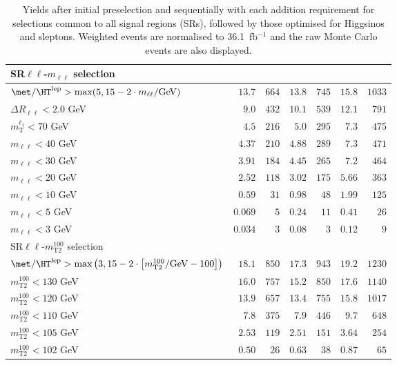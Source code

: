 \begin{table}
\begin{center}
\begin{tabular*}{\textwidth}{@{\extracolsep{\fill}}lrrrrrr}
\midrule
SR$\ell\ell$-$m_{\ell\ell}$ selection &  &  & \\ 
\midrule
$\met / \HT^\text{lep} > \text{max}(5, 15-2\cdot m_{\ell\ell}/\text{GeV})$ & $13.7$ & $664$    & $13.8$ & $745$    & $15.8$ & $1033$   \\ 
    $\Delta R_{\ell\ell} < 2.0$ GeV & $9.0$ & $432$    & $10.1$ & $539$    & $12.1$ & $791$   \\ 
    $m_\text{T}^{\ell_1} < 70$ GeV & $4.5$ & $216$    & $5.0$ & $295$    & $7.3$ & $475$   \\ 
    $m_{\ell\ell} < 40$ GeV & $4.37$ & $210$    & $4.88$ & $289$    & $7.3$ & $471$   \\ 
    $m_{\ell\ell} < 30$ GeV & $3.91$ & $184$    & $4.45$ & $265$    & $7.2$ & $464$   \\ 
    $m_{\ell\ell} < 20$ GeV & $2.52$ & $118$    & $3.02$ & $175$    & $5.66$ & $363$   \\ 
    $m_{\ell\ell} < 10$ GeV & $0.59$ & $31$    & $0.98$ & $48$    & $1.99$ & $125$   \\ 
    $m_{\ell\ell} < 5$ GeV & $0.069$ & $5$    & $0.24$ & $11$    & $0.41$ & $26$   \\ 
    $m_{\ell\ell} < 3$ GeV & $0.034$ & $3$    & $0.08$ & $3$    & $0.12$ & $9$   \\ 
    \midrule
SR$\ell\ell$-$m_\text{T2}^{100}$ selection &  &  & \\ 
\midrule
$\met / \HT^\text{lep} > \text{max}\left(3, 15-2\cdot \left[m_\text{T2}^{100}/\text{GeV} - 100\right]\right)$ & $18.1$ & $850$    & $17.3$ & $943$    & $19.2$ & $1230$   \\ 
    $m_\text{T2}^{100} < 130$ GeV & $16.0$ & $757$    & $15.2$ & $850$    & $17.6$ & $1140$   \\ 
    $m_\text{T2}^{100} < 120$ GeV & $13.9$ & $657$    & $13.4$ & $755$    & $15.8$ & $1017$   \\ 
    $m_\text{T2}^{100} < 110$ GeV & $7.8$ & $375$    & $7.9$ & $446$    & $9.7$ & $648$   \\ 
    $m_\text{T2}^{100} < 105$ GeV & $2.53$ & $119$    & $2.51$ & $151$    & $3.64$ & $254$   \\ 
    $m_\text{T2}^{100} < 102$ GeV & $0.50$ & $26$    & $0.63$ & $38$    & $0.87$ & $65$   \\ 
    
  \bottomrule
  \end{tabular*}
\end{center}
\caption{ Yields after initial preselection and sequentially with each addition requirement 
for selections common to all signal regions (SRs), 
followed by those optimised for Higgsinos and sleptons. 
Weighted events are normalised to 36.1~fb$^{-1}$ and the raw Monte Carlo events are also displayed.
}
\label{tab:cutflow_NUHM2}
\end{table} 
  
